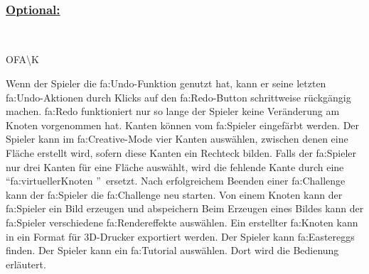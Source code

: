 ~\\


%
%
\subsubsection*{\underline{Optional:}}~\\


\begin{ids}{\gls{OFA\K}}

	\id[ 190] Wenn der Spieler die \gls{fa:Undo}-Funktion genutzt hat, kann er seine letzten \gls{fa:Undo}-Aktionen durch Klicks auf den \gls{fa:Redo}-Button schrittweise rückgängig machen. {\gls{fa:Redo}} funktioniert nur so lange der Spieler keine Veränderung am Knoten vorgenommen hat.
 	\id[ 200] Kanten können vom \gls{fa:Spieler} eingefärbt werden.
 	\id[ 210] Der Spieler kann im \gls{fa:Creative}-Mode vier Kanten auswählen, zwischen denen eine Fläche erstellt wird, sofern diese Kanten ein Rechteck bilden.
 	\id[ 220] Falls der \gls{fa:Spieler} nur drei Kanten für eine Fläche auswählt, wird  die fehlende Kante durch eine \textquotedblleft \gls{fa:virtuellerKnoten} \textquotedblright~ersetzt.
	\id [230] Nach erfolgreichem Beenden einer \gls{fa:Challenge} kann der \gls{fa:Spieler} die \gls{fa:Challenge} neu starten.
 	\id[ 240] Von einem Knoten kann der \gls{fa:Spieler} ein Bild erzeugen und abspeichern
 	\id[ 250] Beim Erzeugen eines Bildes kann der \gls{fa:Spieler} verschiedene \gls{fa:Rendereffekte} auswählen.
 	\id[ 260] Ein erstellter \gls{fa:Knoten} kann in ein Format für 3D-Drucker exportiert werden.
 	\id[ 270] Der Spieler kann \gls{fa:Easteregg}s finden.
 	\id[ 275] Der Spieler kann ein \gls{fa:Tutorial} auswählen. Dort wird die Bedienung erläutert.
 	
	
\end{ids}

~\\
